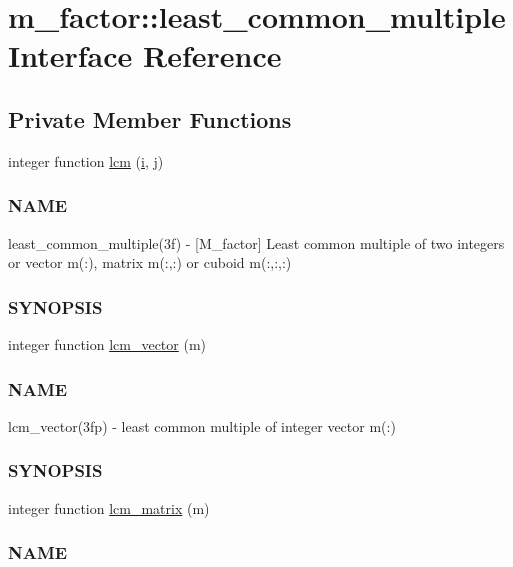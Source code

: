 \hypertarget{interfacem__factor_1_1least__common__multiple}{}\section{m\+\_\+factor\+:\+:least\+\_\+common\+\_\+multiple Interface Reference}
\label{interfacem__factor_1_1least__common__multiple}
\subsection*{Private Member Functions}
\begin{DoxyCompactItemize}
\item 
integer function \hyperlink{interfacem__factor_1_1least__common__multiple_aca2f4d6fbd586ba4c773be0526f926a9}{lcm} (\hyperlink{intro__blas1_83_8txt_a8ba82a50c0c2c12d5f6a77f7e4651c0b}{i}, \hyperlink{exit_87_8txt_a8921ef29c441e427867c54bd3b2462ba}{j})
\begin{DoxyCompactList}\small\item\em \subsubsection*{N\+A\+ME}

least\+\_\+common\+\_\+multiple(3f) -\/ \mbox{[}M\+\_\+factor\mbox{]} Least common multiple of two integers or vector m(\+:), matrix m(\+:,\+:) or cuboid m(\+:,\+:,\+:) \subsubsection*{S\+Y\+N\+O\+P\+S\+IS}\end{DoxyCompactList}\item 
integer function \hyperlink{interfacem__factor_1_1least__common__multiple_ac98c390a19d96491af8805d01d92fdd6}{lcm\+\_\+vector} (m)
\begin{DoxyCompactList}\small\item\em \subsubsection*{N\+A\+ME}

lcm\+\_\+vector(3fp) -\/ least common multiple of integer vector m(\+:) \subsubsection*{S\+Y\+N\+O\+P\+S\+IS}\end{DoxyCompactList}\item 
integer function \hyperlink{interfacem__factor_1_1least__common__multiple_a0fba2999ed8a72d4e645db349dd6930a}{lcm\+\_\+matrix} (m)
\begin{DoxyCompactList}\small\item\em \subsubsection*{N\+A\+ME}


\end{DoxyCompactList}
\end{DoxyCompactItemize}
